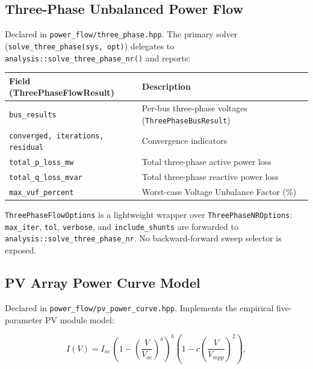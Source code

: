 \subsection{Three-Phase Unbalanced Power Flow}
\label{sec:three-phase}

Declared in \texttt{power\_flow/three\_phase.hpp}.  The primary solver
(\texttt{solve\_three\_phase(sys, opt)}) delegates to
\texttt{analysis::solve\_three\_phase\_nr()} and reports:

\begin{center}
\begin{tabular}{ll}
\hline\hline
\textbf{Field (ThreePhaseFlowResult)} & \textbf{Description} \\
\hline
\texttt{bus\_results} & Per-bus three-phase voltages (\texttt{ThreePhaseBusResult}) \\
\texttt{converged, iterations, residual} & Convergence indicators \\
\texttt{total\_p\_loss\_mw} & Total three-phase active power loss \\
\texttt{total\_q\_loss\_mvar} & Total three-phase reactive power loss \\
\texttt{max\_vuf\_percent} & Worst-case Voltage Unbalance Factor (\%) \\
\hline\hline
\end{tabular}
\end{center}

\texttt{ThreePhaseFlowOptions} is a lightweight wrapper over
\texttt{ThreePhaseNROptions}: \texttt{max\_iter}, \texttt{tol},
\texttt{verbose}, and \texttt{include\_shunts} are forwarded to
\texttt{analysis::solve\_three\_phase\_nr}.  No backward-forward sweep selector
is exposed.

\subsection{PV Array Power Curve Model}
\label{sec:pv-curve}

Declared in \texttt{power\_flow/pv\_power\_curve.hpp}.  Implements the
empirical five-parameter PV module model:

\begin{equation}
  I(V) = I_{sc}\,\left(1 - \left(\frac{V}{V_{oc}}\right)^a\right)^b
           \left(1 - c\left(\frac{V}{V_{mpp}}\right)^2\right),
\end{equation}

